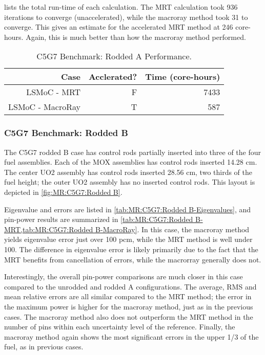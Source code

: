 {{{{         lists the total run-time of each calculation.
        The \ac{MRT} calculation took 936 iterations to converge (unaccelerated), while the macroray method took 31 to converge.
        This gives an estimate for the accelerated \ac{MRT} method at 246 core-hours.
        Again, this is much better than how the macroray method performed.

        \begin{table}[htbp]
          \centering
          \caption{C5G7 Benchmark: Rodded A Performance. \label{tab:MR:C5G7:Rodded A-Performance}}
          \begin{tabular}{rrr}\toprule
            Case                        & Acclerated? & Time (core-hours)\\\midrule
            LSMoC - MRT                 & F &  7433\\
            LSMoC - MacroRay            & T &   587\\\bottomrule
          \end{tabular}
        \end{table}
      }

      \subsubsection{C5G7 Benchmark: Rodded B}{\label{sssec:MR:C5G7:Rodded B}
        The C5G7 rodded B case has control rods partially inserted into three of the four fuel assemblies.
        Each of the \ac{MOX} assemblies has control rods inserted 14.28 cm.
        The center \ac{UO2} assembly has control rods inserted 28.56 cm, two thirds of the fuel height; the outer \ac{UO2} assembly has no inserted control rods.
        This layout is depicted in \cref{fig:MR:C5G7:Rodded B}.

        Eigenvalue and errors are listed in \cref{tab:MR:C5G7:Rodded B-Eigenvalues}, and pin-power results are summarized in \cref{tab:MR:C5G7:Rodded B-MRT,tab:MR:C5G7:Rodded B-MacroRay}.
        In this case, the macroray method yields eigenvalue error just over 100 pcm, while the \ac{MRT} method is well under 100.
        The difference in eigenvalue error is likely primarily due to the fact that the \ac{MRT} benefits from cancellation of errors, while the macrorray generally does not.

        Interestingly, the overall pin-power comparisons are much closer in this case compared to the unrodded and rodded A configurations.
        The average, RMS and mean relative errors are all similar compared to the \ac{MRT} method; the error in the maximum power is higher for the macroray method, just as in the previous cases.
        The macroray method also does not outperform the \ac{MRT} method in the number of pins within each uncertainty level of the reference.
        Finally, the macroray method again shows the most significant errors in the upper 1/3 of the fuel, as in previous cases.

}}}}
